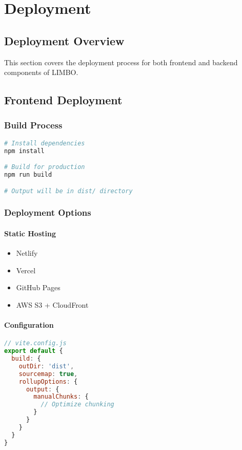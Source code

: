 \chapter{Deployment}

\section{Deployment Overview}
This section covers the deployment process for both frontend and backend components of LIMBO.

\section{Frontend Deployment}
\subsection{Build Process}
\begin{tcolorbox}[title=Build Frontend]
\begin{lstlisting}[language=bash]
# Install dependencies
npm install

# Build for production
npm run build

# Output will be in dist/ directory
\end{lstlisting}
\end{tcolorbox}

\subsection{Deployment Options}
\subsubsection{Static Hosting}
\begin{itemize}
    \item Netlify
    \item Vercel
    \item GitHub Pages
    \item AWS S3 + CloudFront
\end{itemize}

\subsubsection{Configuration}
\begin{lstlisting}[language=javascript]
// vite.config.js
export default {
  build: {
    outDir: 'dist',
    sourcemap: true,
    rollupOptions: {
      output: {
        manualChunks: {
          // Optimize chunking
        }
      }
    }
  }
}
\end{lstlisting}

